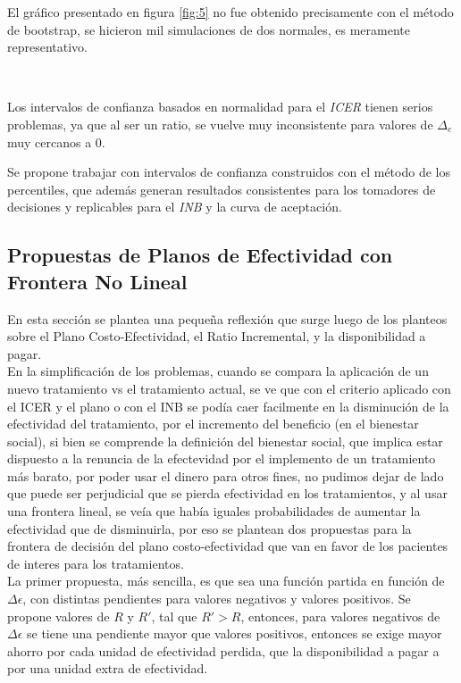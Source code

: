 \documentclass{siep}
\begin{document}
El gráfico presentado en figura \ref{fig:5} no fue obtenido precisamente con el método de bootstrap, se hicieron mil simulaciones de dos normales, es meramente representativo.

\

Los intervalos de confianza basados en normalidad para el \textit{ICER} tienen serios problemas, ya que al ser un ratio, se vuelve muy inconsistente para valores de $\Delta_e$ muy cercanos a 0.

Se propone trabajar con intervalos de confianza construidos con el método de los percentiles, que además generan resultados consistentes para los tomadores de decisiones y replicables para el \textit{INB} y la curva de aceptación.


\subsection{Propuestas de  Planos de Efectividad con Frontera No Lineal}
\label{sec:PPEFNL}
En esta secci\'on se plantea una pequeña reflexión que surge luego de los planteos sobre el Plano Costo-Efectividad, el Ratio Incremental, y la disponibilidad a pagar.\\
En la simplificación de los problemas, cuando se compara la aplicación de un nuevo tratamiento vs el tratamiento actual, se ve que con el criterio aplicado con el ICER y el plano o con el INB se podía caer facilmente en la disminución de la efectividad del tratamiento, por el incremento del beneficio (en el bienestar social), si bien se comprende la definición del bienestar social, que implica estar dispuesto a la renuncia de la efectevidad por el implemento de un tratamiento más barato, por poder usar el dinero para otros fines, no pudimos dejar de lado que puede ser perjudicial que se pierda efectividad en los tratamientos, y al usar una frontera lineal, se veía que había iguales probabilidades de aumentar la efectividad que de disminuirla, por eso se plantean dos propuestas para la frontera de decisión del plano costo-efectividad que van en favor de los pacientes de interes para los tratamientos.\\

La primer propuesta, más sencilla, es que sea una función partida en función de $\Delta\epsilon$, con distintas pendientes para valores negativos y valores positivos. Se propone valores de $R$ y $R'$, tal que $R'>R$, entonces, para valores negativos de $\Delta\epsilon$ se tiene una pendiente mayor que valores positivos, entonces se exige mayor ahorro por cada unidad de efectividad perdida, que la disponibilidad a pagar a por una unidad extra de efectividad.
\end{document}
